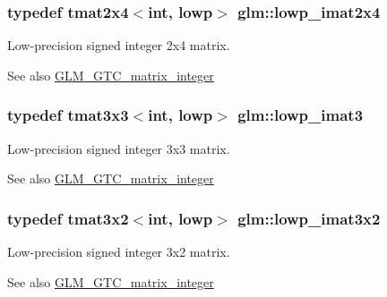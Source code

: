 \subsubsection[{lowp\+\_\+imat2x4}]{\setlength{\rightskip}{0pt plus 5cm}typedef tmat2x4$<$int, lowp$>$ {\bf glm\+::lowp\+\_\+imat2x4}}\label{group__gtc__matrix__integer_gaf664d339f1b66e62ed07c913e60be940}
Low-\/precision signed integer 2x4 matrix. \begin{DoxySeeAlso}{See also}
\hyperlink{group__gtc__matrix__integer}{G\+L\+M\+\_\+\+G\+T\+C\+\_\+matrix\+\_\+integer} 
\end{DoxySeeAlso}
\hypertarget{group__gtc__matrix__integer_ga2f7d17630aa9e27bb9e62f98603a4d7e}{}
\subsubsection[{lowp\+\_\+imat3}]{\setlength{\rightskip}{0pt plus 5cm}typedef tmat3x3$<$int, lowp$>$ {\bf glm\+::lowp\+\_\+imat3}}\label{group__gtc__matrix__integer_ga2f7d17630aa9e27bb9e62f98603a4d7e}
Low-\/precision signed integer 3x3 matrix. \begin{DoxySeeAlso}{See also}
\hyperlink{group__gtc__matrix__integer}{G\+L\+M\+\_\+\+G\+T\+C\+\_\+matrix\+\_\+integer} 
\end{DoxySeeAlso}
\hypertarget{group__gtc__matrix__integer_ga93514d2df726334e6d5edd373635d343}{}
\subsubsection[{lowp\+\_\+imat3x2}]{\setlength{\rightskip}{0pt plus 5cm}typedef tmat3x2$<$int, lowp$>$ {\bf glm\+::lowp\+\_\+imat3x2}}\label{group__gtc__matrix__integer_ga93514d2df726334e6d5edd373635d343}
Low-\/precision signed integer 3x2 matrix. \begin{DoxySeeAlso}{See also}
\hyperlink{group__gtc__matrix__integer}{G\+L\+M\+\_\+\+G\+T\+C\+\_\+matrix\+\_\+integer} 
\end{DoxySeeAlso}
\hypertarget{group__gtc__matrix__integer_ga434abdeee9a8908660691be659f6693f}{}
